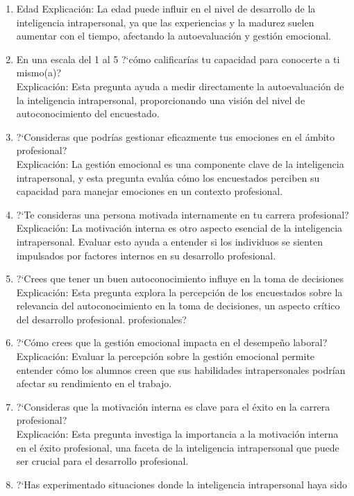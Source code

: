 \begin{enumerate}
\item Edad
Explicación: La edad puede influir en el nivel de desarrollo de la inteligencia intrapersonal, ya que las experiencias y la madurez suelen aumentar con el tiempo, afectando la autoevaluación y gestión emocional.
\item En una escala del 1 al 5 ?`c\'omo calificar\'ias tu capacidad para conocerte
a ti mismo(a)?\\
Explicación: Esta pregunta ayuda a medir directamente la autoevaluación de la inteligencia intrapersonal, proporcionando una visión del nivel de autoconocimiento del encuestado.
\item ?`Consideras que podr\'ias gestionar eficazmente tus emociones en el \'ambito
profesional?\\
Explicación: La gestión emocional es una componente clave de la inteligencia intrapersonal, y esta pregunta evalúa cómo los encuestados perciben su capacidad para manejar emociones en un contexto profesional.
\item ?`Te consideras una persona motivada internamente en tu carrera profesional?\\
Explicación: La motivación interna es otro aspecto esencial de la inteligencia intrapersonal. Evaluar esto ayuda a entender si los individuos se sienten impulsados por factores internos en su desarrollo profesional.
\item ?`Crees que tener un buen autoconocimiento influye en la toma de decisiones
Explicación: Esta pregunta explora la percepción de los encuestados sobre la relevancia del autoconocimiento en la toma de decisiones, un aspecto crítico del desarrollo profesional.
profesionales?\\
\item ?`C\'omo crees que la gesti\'on emocional impacta en el desempe\~no laboral?\\
Explicación: Evaluar la percepción sobre la gestión emocional permite entender cómo los alumnos creen que sus habilidades intrapersonales podrían afectar su rendimiento en el trabajo.
\item ?`Consideras que la motivaci\'on interna es clave para el \'exito en la carrera profesional?\\
Explicación: Esta pregunta investiga la importancia a la motivación interna en el éxito profesional, una faceta de la inteligencia intrapersonal que puede ser crucial para el desarrollo profesional.
\item ?`Has experimentado situaciones donde la inteligencia intrapersonal haya sido

\end{enumerate}
